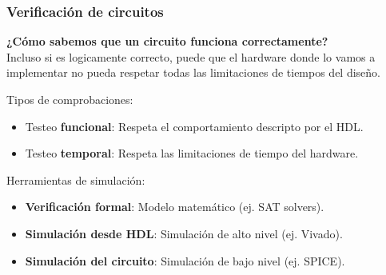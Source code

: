 \documentclass[aspectratio=169]{beamer}
\begin{document}
\begin{frame}[fragile,t]
    \frametitle{Verificación de circuitos}
    \begin{center}
    \textcolor{naranjauca}{\Large \textbf{¿Cómo sabemos que un circuito funciona correctamente?}}\\
    \bigskip
    \pause
    \textcolor{verdeuca}{Incluso si es logicamente correcto, puede que el hardware donde lo vamos a\\ implementar no pueda respetar todas las limitaciones de tiempos del diseño.}\\
    \end{center}
    \pause
    Tipos de comprobaciones:\\
    \begin{itemize}
    \item Testeo \textbf{funcional}: Respeta el comportamiento descripto por el HDL.
    \item Testeo \textbf{temporal}: Respeta las limitaciones de tiempo del hardware.
    \end{itemize}
    \bigskip
    \pause
    Herramientas de simulación:\\
    \begin{itemize}
     \item \textbf{Verificación formal}: Modelo matemático (ej. SAT solvers).
     \item \textbf{Simulación desde HDL}: Simulación de alto nivel (ej. Vivado).
     \item \textbf{Simulación del circuito}: Simulación de bajo nivel (ej. SPICE).
    \end{itemize}
\end{frame}
\end{document}
